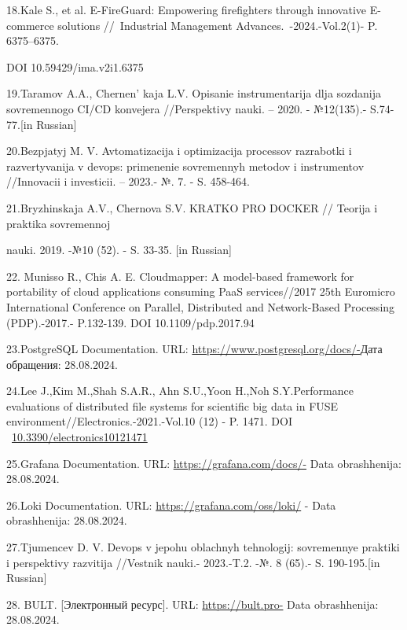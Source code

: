 \begin{references}
18.Kale S., et al. E-FireGuard: Empowering firefighters through
innovative E-commerce solutions //~Industrial Management
Advances.~-2024.-Vol.2(1)- P. 6375--6375.

DOI 10.59429/ima.v2i1.6375

19.Taramov A.A., Chernen' kaja L.V. Opisanie
instrumentarija dlja sozdanija sovremennogo CI/CD konvejera
//Perspektivy nauki. -- 2020. - №12(135).- S.74-77.{[}in Russian{]}

20.Bezpjatyj M. V. Avtomatizacija i optimizacija processov razrabotki i
razvertyvanija v devops: primenenie sovremennyh metodov i instrumentov
//Innovacii i investicii. -- 2023.- №. 7. - S. 458-464.

21.Bryzhinskaja A.V., Chernova S.V. KRATKO PRO DOCKER // Teorija i
praktika sovremennoj

nauki. 2019. -№10 (52). - S. 33-35. {[}in Russian{]}

22. Munisso R., Chis A. E. Cloudmapper: A model-based framework for
portability of cloud applications consuming PaaS services//2017 25th
Euromicro International Conference on Parallel, Distributed and
Network-Based Processing (PDP).-2017.- P.132-139. DOI
10.1109/pdp.2017.94

23.PostgreSQL Documentation. URL:
\url{https://www.postgresql.org/docs/-}Дата обращения: 28.08.2024.

24.Lee J.,Kim M.,Shah S.A.R., Ahn S.U.,Yoon H.,Noh S.Y.Performance
evaluations of distributed file systems for scientific big data in FUSE
environment//Electronics.-2021.-Vol.10 (12) - P. 1471. DOI
~\href{https://doi.org/10.3390/electronics10121471}{10.3390/electronics10121471}

25.Grafana Documentation. URL: \url{https://grafana.com/docs/-} Data
obrashhenija: 28.08.2024.

26.Loki Documentation. URL: \url{https://grafana.com/oss/loki/} - Data
obrashhenija: 28.08.2024.

27.Tjumencev D. V. Devops v jepohu oblachnyh tehnologij: sovremennye
praktiki i perspektivy razvitija //Vestnik nauki.- 2023.-T.2. -№. 8
(65).- S. 190-195.{[}in Russian{]}

28. BULT. {[}Электронный ресурс{]}. URL: \url{https://bult.pro-} Data
obrashhenija: 28.08.2024.
\end{references}


